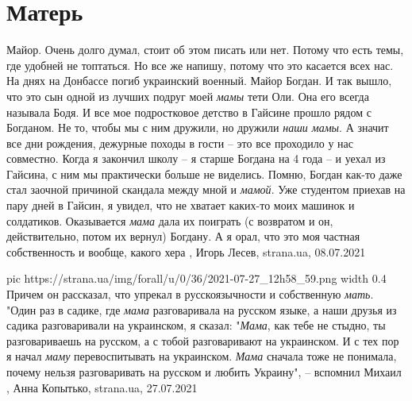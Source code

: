  
 
 
 
 
\chapter{Матерь}

Майор.
Очень долго думал, стоит об этом писать или нет. Потому что есть темы, где
удобней не топтаться. Но все же напишу, потому что это касается всех нас.
На днях на Донбассе погиб украинский военный. Майор Богдан. И так вышло, что
это сын одной из лучших подруг моей \emph{мамы} тети Оли. Она его всегда называла
Бодя. И все мое подростковое детство в Гайсине прошло рядом с Богданом. Не то,
чтобы мы с ним дружили, но дружили \emph{наши мамы}. А значит все дни рождения,
дежурные походы в гости – это все проходило у нас совместно.
Когда я закончил школу – я старше Богдана на 4 года – и уехал из Гайсина, с ним
мы практически больше не виделись. Помню, Богдан как-то даже стал заочной
причиной скандала между мной и \emph{мамой}. Уже студентом приехав на пару дней в
Гайсин, я увидел, что не хватает каких-то моих машинок и солдатиков.
Оказывается \emph{мама} дала их поиграть (с возвратом и он, действительно, потом их
вернул) Богдану. А я орал, что это моя частная собственность и вообще, какого
хера
, 
Игорь Лесев, strana.ua, 08.07.2021

\ifcmt
  pic https://strana.ua/img/forall/u/0/36/2021-07-27_12h58_59.png
  width 0.4
\fi
Причем он рассказал, что упрекал в русскоязычности и собственную \emph{мать}.
"Один раз в садике, где \emph{мама} разговаривала на русском языке, а наши друзья из
садика разговаривали на украинском, я сказал: "\emph{Мама}, как тебе не стыдно, ты
разговариваешь на русском, а с тобой разговаривают на украинском. И с тех пор я
начал \emph{маму} перевоспитывать на украинском. \emph{Мама} сначала тоже не понимала, почему
нельзя разговаривать на русском и любить Украину", – вспомнил Михаил
, 
Анна Копытько, strana.ua, 27.07.2021

